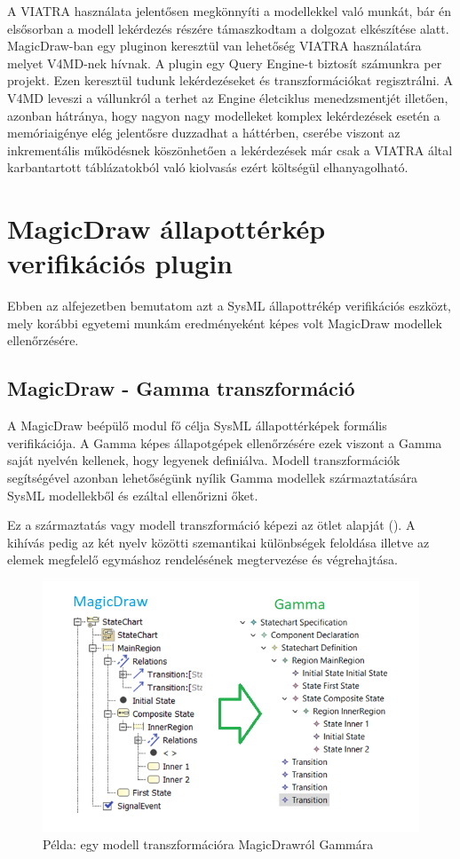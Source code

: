 A VIATRA használata jelentősen megkönnyíti a modellekkel való munkát, bár én elsősorban a modell lekérdezés részére támaszkodtam a dolgozat elkészítése alatt. MagicDraw-ban egy pluginon keresztül van lehetőség VIATRA használatára melyet V4MD-nek hívnak. A plugin egy Query Engine-t biztosít számunkra per projekt. Ezen keresztül tudunk lekérdezéseket és transzformációkat regisztrálni. A V4MD leveszi a vállunkról a terhet az Engine életciklus menedzsmentjét illetően, azonban hátránya, hogy nagyon nagy modelleket komplex lekérdezések esetén a memóriaigénye elég jelentősre duzzadhat a háttérben, cserébe viszont az inkrementális működésnek köszönhetően a lekérdezések már csak a VIATRA által karbantartott táblázatokból való kiolvasás ezért költségül elhanyagolható.

\section{MagicDraw állapottérkép verifikációs plugin}

Ebben az alfejezetben bemutatom azt a SysML állapottrékép verifikációs eszközt, mely korábbi egyetemi munkám eredményeként képes volt MagicDraw modellek ellenőrzésére.

\subsection{MagicDraw - Gamma transzformáció}

A MagicDraw beépülő modul fő célja SysML állapottérképek formális verifikációja. A Gamma képes állapotgépek ellenőrzésére ezek viszont a Gamma saját nyelvén kellenek, hogy legyenek definiálva. Modell transzformációk segítségével azonban lehetőségünk nyílik Gamma modellek származtatására SysML modellekből és ezáltal ellenőrizni őket.

Ez a származtatás vagy modell transzformáció képezi az ötlet alapját (). A kihívás pedig az két nyelv közötti szemantikai különbségek feloldása illetve az elemek megfelelő egymáshoz rendelésének megtervezése és végrehajtása.

\begin{figure}[!ht]
	\centering
	\includegraphics[width=150mm, keepaspectratio]{figures/preliminaries/md-g.png}
	\caption{Példa: egy modell transzformációra MagicDrawról Gammára}
	\label{fig:preliminaries-md-g}
\end{figure}

